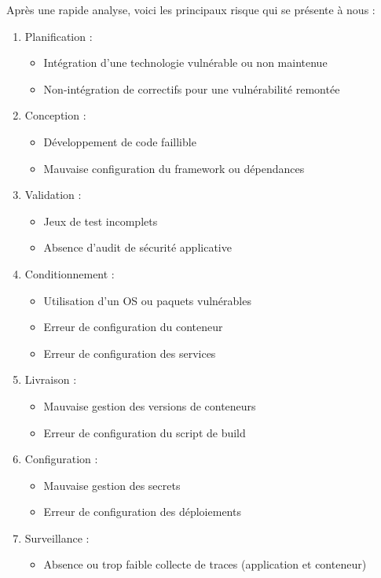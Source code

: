 Après une rapide analyse, voici les principaux risque qui se présente à nous :
\begin{multicols}{2}
    \begin{enumerate}
        \item Planification :
        \begin{itemize}
            \item Intégration d'une technologie vulnérable ou non maintenue
            \item Non-intégration de correctifs pour une vulnérabilité remontée
        \end{itemize}
        \item Conception :
        \begin{itemize}
            \item Développement de code faillible
            \item Mauvaise configuration du framework ou dépendances
        \end{itemize}
        \item Validation :
        \begin{itemize}
            \item Jeux de test incomplets
            \item Absence d'audit de sécurité applicative
        \end{itemize}
        \item Conditionnement :
        \begin{itemize}
            \item Utilisation d'un OS ou paquets vulnérables
            \columnbreak
            \item Erreur de configuration du conteneur
            \item Erreur de configuration des services
        \end{itemize}
        \item Livraison :
        \begin{itemize}
            \item Mauvaise gestion des versions de conteneurs
            \item Erreur de configuration du script de build
        \end{itemize}
        \item Configuration :
        \begin{itemize}
            \item Mauvaise gestion des secrets
            \item Erreur de configuration des déploiements
        \end{itemize}
        \item Surveillance :
        \begin{itemize}
            \item Absence ou trop faible collecte de traces (application et conteneur)
        \end{itemize}
    \end{enumerate}
\end{multicols}

